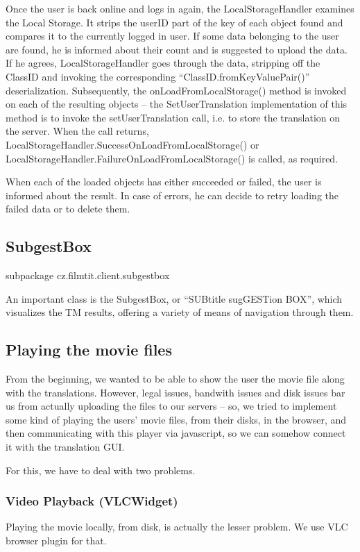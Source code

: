 Once the user is back online and logs in again, the LocalStorageHandler examines the Local Storage. It strips the userID part of the key of each object found and compares it to the currently logged in user. If some data belonging to the user are found, he is informed about their count and is suggested to upload the data. If he agrees, LocalStorageHandler goes through the data, stripping off the ClassID and invoking the corresponding ``ClassID.fromKeyValuePair()'' deserialization. Subsequently, the onLoadFromLocalStorage() method is invoked on each of the resulting objects -- the SetUserTranslation implementation of this method is to invoke the setUserTranslation call, i.e. to store the translation on the server. When the call returns, LocalStorageHandler.SuccessOnLoadFromLocalStorage() or LocalStorageHandler.FailureOnLoadFromLocalStorage() is called, as required.

When each of the loaded objects has either succeeded or failed, the user is informed about the result. In case of errors, he can decide to retry loading the failed data or to delete them.

\subsection{SubgestBox}

subpackage cz.filmtit.client.subgestbox

An important class is the SubgestBox, or ``SUBtitle sugGESTion BOX'', which visualizes the TM results, offering a variety of means of navigation through them.

\subsection{Playing the movie files}
From the beginning, we wanted to be able to show the user the movie file along with the translations. However, legal issues, bandwith issues and disk issues bar us from actually uploading the files to our servers -- so, we tried to implement some kind of playing the users' movie files, from their disks, in the browser, and then communicating with this player via javascript, so we can somehow connect it with the translation GUI.

For this, we have to deal with two problems.

\subsubsection*{Video Playback (VLCWidget)}
Playing the movie locally, from disk, is actually the lesser problem. We use VLC browser plugin for that.

